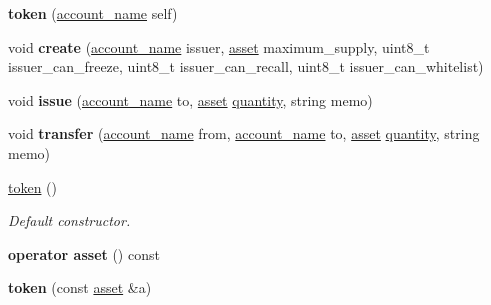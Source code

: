 \begin{DoxyCompactItemize}
\item 
\mbox{\label{classaacio_1_1token_a6da99e92b92aeeb3b9b9f4b7bd6329c0}} 
{\bfseries token} (\mbox{\hyperlink{structaacio_1_1chain_1_1name}{account\+\_\+name}} self)
\item 
\mbox{\label{classaacio_1_1token_a8a2507f9df45c5dae5d573409d23796b}} 
void {\bfseries create} (\mbox{\hyperlink{structaacio_1_1chain_1_1name}{account\+\_\+name}} issuer, \mbox{\hyperlink{structaacio_1_1asset}{asset}} maximum\+\_\+supply, uint8\+\_\+t issuer\+\_\+can\+\_\+freeze, uint8\+\_\+t issuer\+\_\+can\+\_\+recall, uint8\+\_\+t issuer\+\_\+can\+\_\+whitelist)
\item 
\mbox{\label{classaacio_1_1token_abda918cd285f54529c9f9ff1ebc6aeee}} 
void {\bfseries issue} (\mbox{\hyperlink{structaacio_1_1chain_1_1name}{account\+\_\+name}} to, \mbox{\hyperlink{structaacio_1_1asset}{asset}} \mbox{\hyperlink{classaacio_1_1token_ab2c38b947ea6525e8a61c3b9cd4e711d}{quantity}}, string memo)
\item 
\mbox{\label{classaacio_1_1token_a83b969eca959af665ffcefbc95028f20}} 
void {\bfseries transfer} (\mbox{\hyperlink{structaacio_1_1chain_1_1name}{account\+\_\+name}} from, \mbox{\hyperlink{structaacio_1_1chain_1_1name}{account\+\_\+name}} to, \mbox{\hyperlink{structaacio_1_1asset}{asset}} \mbox{\hyperlink{classaacio_1_1token_ab2c38b947ea6525e8a61c3b9cd4e711d}{quantity}}, string memo)
\item 
\mbox{\hyperlink{classaacio_1_1token_acfe8cff6ca7f030b2598b0d73281a43f}{token}} ()
\begin{DoxyCompactList}\small\item\em Default constructor. \end{DoxyCompactList}\item 
\mbox{\label{classaacio_1_1token_ae66ba9d4027614edaa1cc2e4e0428326}} 
{\bfseries operator asset} () const
\item 
\mbox{\label{classaacio_1_1token_a0f715291343a53b3e7b37cadd7f0f24e}} 
{\bfseries token} (const \mbox{\hyperlink{structaacio_1_1asset}{asset}} \&a)
\item 

\end{DoxyCompactItemize}
